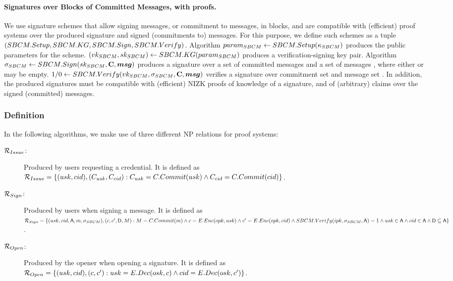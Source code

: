 \paragraph{Signatures over Blocks of Committed Messages, with proofs.} %
We use signature schemes that allow signing messages, or commitment to messages,
in blocks, and are compatible with (efficient) proof systems over the produced
signature and signed (commitments to) messages. For this purpose, we define such
schemes as a tuple $(SBCM.Setup,SBCM.KG,SBCM.Sign,SBCM.Verify)$. Algorithm
$param_{SBCM} \gets SBCM.Setup(\kappa_{SBCM})$ produces the public parameters for the
scheme. $(vk_{SBCM},sk_{SBCM}) \gets SBCM.KG(param_{SBCM})$ produces a
verification-signing key
pair. Algorithm $\sigma_{SBCM} \gets SBCM.Sign(sk_{SBCM},\mathbf{C},\boldsymbol{msg})$ produces a
signature over a set of committed messages \Ccomset and a set of messages
\msgset, where either \Ccomset or \msgset may be empty. $1/0 \gets
SBCM.Verify(vk_{SBCM},\sigma_{SBCM},\mathbf{C},\boldsymbol{msg})$ verifies a signature \SBCMsig
over commitment set \Ccomset and message set \msgset. In addition, the produced
signatures must be compatible with (efficient) NIZK proofs of knowledge of a
signature, and of (arbitrary) claims over the signed (committed) messages.

\subsubsection{Definition}
\label{sssec:generic-gsac-definition}

In the following algorithms, we make use of three different NP relations for
\NIZK proof systems:

\begin{description}
\item[$\mathcal{R}_{Issue}$:] Produced by users requesting a credential. It is
  defined as $\mathcal{R}_{Issue} = \lbrace (usk,cid), (C_{usk},C_{cid}) :
  C_{usk} = C.Commit(usk) \land C_{cid} = C.Commit(cid) \rbrace$.
\item[$\mathcal{R}_{Sign}$:] Produced by users when signing a message. It is
  defined as $\mathcal{R}_{Sign} = \lbrace (usk,cid,\mathsf{A},m,\sigma_{SBCM}),
  (c,c',\mathsf{D},M) : M = C.Commit(m) \land c = E.Enc(opk,usk) \land
  c' = E.Enc(opk,cid) \land SBCM.Verify(ipk,\sigma_{SBCM},\mathsf{A}) = 1 \land
  usk \in \mathsf{A} \land cid \in \mathsf{A} \land \mathsf{D} \subseteq \mathsf{A} \rbrace$.
\item[$\mathcal{R}_{Open}$:] Produced by the opener when opening a signature. It
  is defined as $\mathcal{R}_{Open} = \lbrace (usk,cid), (c,c') :
  usk = E.Dec(osk,c) \land cid = E.Dec(osk,c') \rbrace$.
\end{description}

